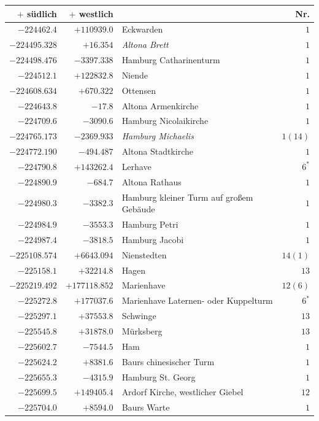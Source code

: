 \clearpage{}%
\begin{center}\begingroup\fontsize{8}{9}\selectfont
\setlength{\tabcolsep}{4pt}
\begin{tabular}{r|r|p{170pt}|r}\hline
\(+\) südlich&\(+\) westlich&&Nr.\\\hline
\(-224462.4\)&\(+110939.0\)&Eckwarden&\(1\)\\
\(-224495.328\)&\(+16.354\)&\textit{Altona Brett}&\(1\)\\
\(-224498.476\)&\(-3397.338\)&Hamburg Catharinenturm&\(1\)\\
\(-224512.1\)&\(+122832.8\)&Niende&\(1\)\\
\(-224608.634\)&\(+670.322\)&Ottensen&\(1\)\\
\(-224643.8\)&\(-17.8\)&Altona Armenkirche&\(1\)\\
\(-224709.6\)&\(-3090.6\)&Hamburg Nicolaikirche&\(1\)\\
\(-224765.173\)&\(-2369.933\)&\textit{Hamburg Michaelis}&\(1(14)\)\\
\(-224772.190\)&\(-494.487\)&Altona Stadtkirche&\(1\)\\
\(-224790.8\)&\(+143262.4\)&Lerhave&\(6^{*}\)\\
\(-224890.9\)&\(-684.7\)&Altona Rathaus&\(1\)\\
\(-224980.3\)&\(-3382.3\)&Hamburg kleiner Turm auf großem Gebäude&\(1\)\\
\(-224984.9\)&\(-3553.3\)&Hamburg Petri&\(1\)\\
\(-224987.4\)&\(-3818.5\)&Hamburg Jacobi&\(1\)\\
\(-225108.574\)&\(+6643.094\)&Nienstedten&\(14(1)\)\\
\(-225158.1\)&\(+32214.8\)&Hagen&\(13\)\\
\(-225219.492\)&\(+177118.852\)&Marienhave&\(12(6)\)\\
\(-225272.8\)&\(+177037.6\)&Marienhave Laternen- oder Kuppelturm&\(6^{*}\)\\
\(-225297.1\)&\(+37553.8\)&Schwinge&\(13\)\\
\(-225545.8\)&\(+31878.0\)&Mürksberg&\(13\)\\
\(-225602.7\)&\(-7544.5\)&Ham&\(1\)\\
\(-225624.2\)&\(+8381.6\)&Baurs chinesischer Turm&\(1\)\\
\(-225655.3\)&\(-4315.9\)&Hamburg St. Georg&\(1\)\\
\(-225699.5\)&\(+149405.4\)&Ardorf Kirche, westlicher Giebel&\(12\)\\
\(-225704.0\)&\(+8594.0\)&Baurs Warte&\(1\)\\

\end{tabular}
\end{center}
